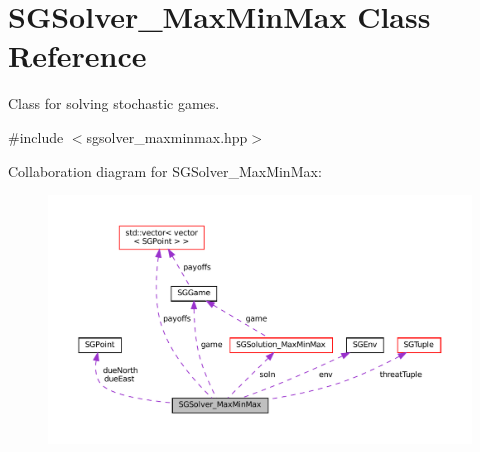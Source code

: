 \hypertarget{classSGSolver__MaxMinMax}{}\section{S\+G\+Solver\+\_\+\+Max\+Min\+Max Class Reference}
\label{classSGSolver__MaxMinMax}


Class for solving stochastic games.  




{\ttfamily \#include $<$sgsolver\+\_\+maxminmax.\+hpp$>$}



Collaboration diagram for S\+G\+Solver\+\_\+\+Max\+Min\+Max\+:
\nopagebreak
\begin{figure}[H]
\begin{center}
\leavevmode
\includegraphics[width=350pt]{classSGSolver__MaxMinMax__coll__graph}
\end{center}
\end{figure}
